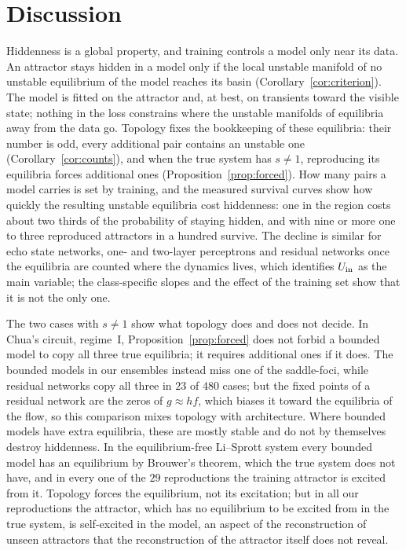 \section{Discussion}
\label{sec:discussion}

Hiddenness is a global property, and training controls a model only near its data. An attractor stays hidden in a model
only if the local unstable manifold of no unstable equilibrium of the model reaches its basin (Corollary~\ref{cor:criterion}).
The model is fitted on the attractor and, at best, on transients toward the visible state; nothing in the loss constrains
where the unstable manifolds of equilibria away from the data go. Topology fixes the bookkeeping of these equilibria: their
number is odd, every additional pair contains an unstable one (Corollary~\ref{cor:counts}), and when the true system has
$s\neq1$, reproducing its equilibria forces additional ones (Proposition~\ref{prop:forced}). How many pairs a model carries is
set by training, and the measured survival curves show how quickly the resulting unstable equilibria cost hiddenness: one in
the region costs about two thirds of the probability of staying hidden, and with nine or more one to three reproduced
attractors in a hundred survive. The decline is similar for echo state networks, one- and two-layer perceptrons and residual networks once
the equilibria are counted where the dynamics lives, which identifies $U_{\mathrm{in}}$ as the main variable; the class-specific slopes
and the effect of the training set show that it is not the only one.

The two cases with $s\neq1$ show what topology does and does not decide. In Chua's circuit, regime~I,
Proposition~\ref{prop:forced} does not forbid a bounded model to copy all three true equilibria; it requires additional ones
if it does. The bounded models in our ensembles instead miss one of the saddle-foci, while residual networks copy all three
in $23$ of $480$ cases; but the fixed points of a residual network are the zeros of $g\approx h f$, which biases it toward the
equilibria of the flow, so this comparison mixes topology with architecture. Where bounded models have extra equilibria,
these are mostly stable and do not by themselves destroy hiddenness. In the equilibrium-free Li--Sprott system every
bounded model has an equilibrium by Brouwer's theorem, which the true system does not have, and in every one of the $29$
reproductions the training attractor is excited from it. Topology forces the equilibrium, not its excitation; but in all our reproductions the attractor, which has
no equilibrium to be excited from in the true system, is self-excited in the model, an aspect of the reconstruction of
unseen attractors\cite{Rohm2021} that the reconstruction of the attractor itself does not reveal.

